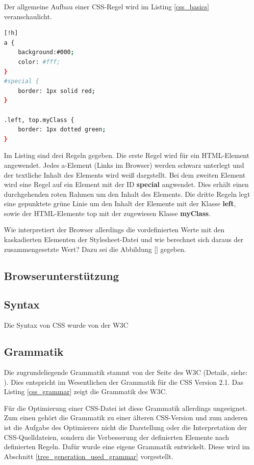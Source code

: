 \documentclass[11pt]{scrartcl}
\begin{document}
Der allgemeine Aufbau einer CSS-Regel wird im Listing \ref{css_basics} veranschaulicht.   
\begin{lstlisting}[label=css_basics,language=bash, caption=Aufbau einer CSS-Regel][!h]
a {
    background:#000;
    color: #fff;
}  
#special {
    border: 1px solid red;
}

.left, top.myClass {
    border: 1px dotted green;
}
\end{lstlisting}

Im Listing sind drei Regeln gegeben. Die erste Regel wird für ein HTML-Element angewendet. Jedes a-Element (Links im Browser) werden schwarz unterlegt und der textliche Inhalt des Elements wird weiß dargstellt. Bei dem zweiten Element wird eine Regel auf ein Element mit der ID \textbf{special} angwendet. Dies erhält einen durchgehenden roten Rahmen um den Inhalt des Elements. Die dritte Regeln legt eine gepunktete grüne Linie um den Inhalt der Elemente mit der Klasse \textbf{left}, sowie der HTML-Elemente top mit der zugewiesen Klasse \textbf{myClass}.  

Wie interpretiert der Browser allerdings die vordefinierten Werte mit den kaskadierten Elementen der Stylesheet-Datei und wie berechnet sich daraus der zusammengesetzte Wert? Dazu sei die Abbildung [] gegeben. %



\subsection{Browserunterstützung}
\subsection{Syntax}
Die Syntax von CSS wurde von der W3C 
\cite{w3c_css_syntax}
\subsection{Grammatik}
Die zugrundeliegende Grammatik stammt von der Seite des W3C (Details, siehe: \cite{w3c_css_grammar}). Dies entspricht im Wesentlichen der Grammatik für die CSS Version 2.1. Das Listing \ref{css_grammar} zeigt die Grammatik des W3C. 

Für die Optimierung einer CSS-Datei ist diese Grammatik allerdings ungeeignet. Zum einen gehört die Grammatik zu einer älteren CSS-Version und zum anderen ist die Aufgabe des Optimierers nicht die Darstellung oder die Interpretation der CSS-Quelldateien, sondern die Verbesserung der definierten Elemente nach definierten Regeln. Dafür wurde eine eigene Grammatik entwickelt. Diese wird im Abschnitt \ref{tree_generation_used_grammar} vorgestellt. 
\end{document}
